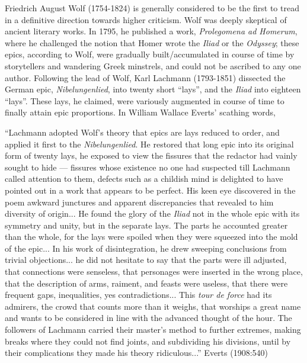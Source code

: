 Friedrich August Wolf (1754-1824) is generally considered to be the first to tread in a definitive direction towards higher criticism. Wolf was deeply skeptical of ancient literary works. In 1795, he published a work, {\sl Prolegomena ad Homerum}, where he challenged the notion that Homer wrote the {\sl Iliad} or the {\sl Odyssey}; these epics, according to Wolf, were gradually built/accumulated in course of time by storytellers and wandering Greek minstrels, and could not be ascribed to any one author. Following the lead of Wolf, Karl Lachmann (1793-1851) dissected the German epic, {\sl Nibelungenlied}, into twenty short “lays”, and the {\sl Iliad} into eighteen “lays”. These lays, he claimed, were variously augmented in course of time to finally attain epic proportions. In William Wallace Everts’ scathing words, 

\begin{myquote}
“Lachmann adopted Wolf’s theory that epics are lays reduced to order, and applied it first to the {\sl Nibelungenlied}. He restored that long epic into its original form of twenty lays, he exposed to view the fissures that the redactor had vainly sought to hide --- fissures whose existence no one had suspected till Lachmann called attention to them, defects such as a childish mind is delighted to have pointed out in a work that appears to be perfect. His keen eye discovered in the poem awkward junctures and apparent discrepancies that revealed to him diversity of origin... He found the glory of the {\sl Iliad} not in the whole epic with its symmetry and unity, but in the separate lays. The parts he accounted greater than the whole, for the lays were spoiled when they were squeezed into the mold of the epic...  In his work of disintegration, he drew sweeping conclusions from trivial objections... he did not hesitate to say that the parts were ill adjusted, that connections were senseless, that personages were inserted in the wrong place, that the description of arms, raiment, and feasts were useless, that there were frequent gaps, inequalities, yes contradictions...  This {\sl tour de force} had its admirers, the crowd that counts more than it weighs, that worships a great name and wants to be considered in line with the advanced thought of the hour. The followers of Lachmann carried their master's method to further extremes, making breaks where they could not find joints, and subdividing his divisions, until by their complications they made his theory ridiculous...”
\hfill Everts (1908:540)
\end{myquote}


